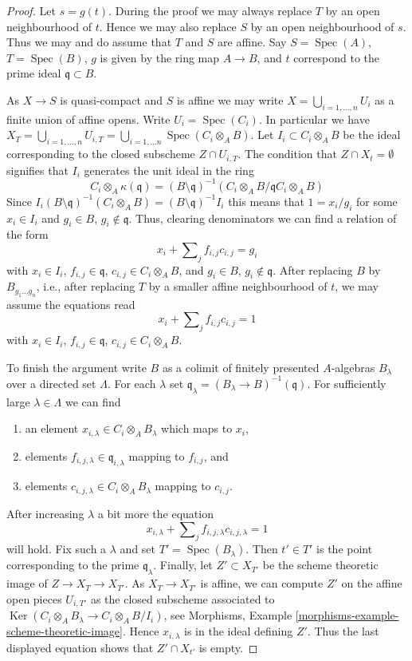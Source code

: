 \documentclass[10pt,a4paper]{amsart}
\theoremstyle{plain}
\theoremstyle{definition}
\theoremstyle{remark}
\numberwithin{equation}{subsection}
\def\Spec{\mathop{\mathrm{Spec}}}
\def\Ker{\mathop{\mathrm{Ker}}}
\begin{document}
\begin{proof}
Let $s = g(t)$. During the proof we may always replace $T$ by an
open neighbourhood of $t$. Hence we may also replace $S$ by an open
neighbourhood of $s$. Thus we may and do assume that $T$ and $S$ are affine.
Say $S = \Spec(A)$, $T = \Spec(B)$, $g$ is given by the
ring map $A \to B$, and $t$ correspond to the prime ideal
$\mathfrak q \subset B$.

\medskip\noindent
As $X \to S$ is quasi-compact and $S$ is affine we may write
$X = \bigcup_{i = 1, \ldots, n} U_i$ as a finite union of affine opens.
Write $U_i = \Spec(C_i)$. In particular we have
$X_T = \bigcup_{i = 1, \ldots, n} U_{i, T} =
\bigcup_{i = 1, \ldots n} \Spec(C_i \otimes_A B)$.
Let $I_i \subset C_i \otimes_A B$ be the ideal corresponding to the
closed subscheme $Z \cap U_{i, T}$. The condition that
$Z \cap X_t = \emptyset$ signifies that $I_i$ generates the
unit ideal in the ring
$$
C_i \otimes_A \kappa(\mathfrak q) =
(B \setminus \mathfrak q)^{-1}\left(
C_i \otimes_A B/\mathfrak q C_i \otimes_A B \right)
$$
Since $I_i (B \setminus \mathfrak q)^{-1}(C_i \otimes_A B) =
(B \setminus \mathfrak q)^{-1} I_i$ this means that $1 = x_i/g_i$
for some $x_i \in I_i$ and $g_i \in B$, $g_i \not \in \mathfrak q$.
Thus, clearing denominators we can find a relation of the form
$$
x_i + \sum\nolimits_j f_{i, j}c_{i, j} = g_i
$$
with $x_i \in I_i$, $f_{i, j} \in \mathfrak q$, $c_{i, j} \in C_i \otimes_A B$,
and $g_i \in B$, $g_i \not \in \mathfrak q$. After replacing $B$ by
$B_{g_1 \ldots g_n}$, i.e., after replacing $T$ by a smaller affine
neighbourhood of $t$, we may assume the equations read
$$
x_i + \sum\nolimits_j f_{i, j}c_{i, j} = 1
$$
with $x_i \in I_i$, $f_{i, j} \in \mathfrak q$, $c_{i, j} \in C_i \otimes_A B$.

\medskip\noindent
To finish the argument write $B$ as a colimit of finitely presented
$A$-algebras $B_\lambda$ over a directed set $\Lambda$.
For each $\lambda$ set
$\mathfrak q_\lambda = (B_\lambda \to B)^{-1}(\mathfrak q)$.
For sufficiently large $\lambda \in \Lambda$ we can find
\begin{enumerate}
\item an element
$x_{i, \lambda} \in C_i \otimes_A B_\lambda$ which maps to $x_i$,
\item elements $f_{i, j, \lambda} \in \mathfrak q_{i, \lambda}$
mapping to $f_{i, j}$, and
\item elements $c_{i, j, \lambda} \in C_i \otimes_A B_\lambda$
mapping to $c_{i, j}$.
\end{enumerate}
After increasing $\lambda$ a bit more the equation
$$
x_{i, \lambda} + \sum\nolimits_j f_{i, j, \lambda}c_{i, j, \lambda} = 1
$$
will hold. Fix such a $\lambda$ and set $T' = \Spec(B_\lambda)$.
Then $t' \in T'$ is the point corresponding to the prime $\mathfrak q_\lambda$.
Finally, let $Z' \subset X_{T'}$ be the scheme theoretic image of
$Z \to X_T \to X_{T'}$. As $X_T \to X_{T'}$ is affine, we can compute $Z'$
on the affine open pieces $U_{i, T'}$ as the closed subscheme associated
to $\Ker(C_i \otimes_A B_\lambda \to C_i \otimes_A B/I_i)$, see
Morphisms, Example \ref{morphisms-example-scheme-theoretic-image}.
Hence $x_{i, \lambda}$ is in the ideal defining $Z'$. Thus the last
displayed equation shows that $Z' \cap X_{t'}$ is empty.
\end{proof}
\end{document}
